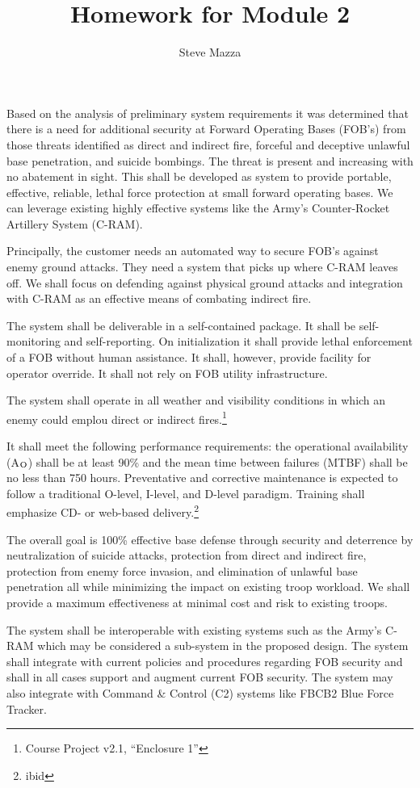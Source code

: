 \documentclass[letterpaper,10pt]{article}
\title{Homework for Module 2}
\author{Steve Mazza}
\begin{document}
\maketitle
Based on the analysis of preliminary system requirements it was determined that there is a need for additional security at Forward Operating Bases (FOB's) from those threats identified as direct and indirect fire, forceful and deceptive unlawful base penetration, and suicide bombings.  The threat is present and increasing with no abatement in sight.  This shall be developed as system to provide portable, effective, reliable, lethal force protection at small forward operating bases.  We can leverage existing highly effective systems like the Army's Counter-Rocket Artillery System (C-RAM).
\par
Principally, the customer needs an automated way to secure FOB's against enemy ground attacks.  They need a system that picks up where C-RAM leaves off.  We shall focus on defending against physical ground attacks and integration with C-RAM as an effective means of combating indirect fire.
\par
The system shall be deliverable in a self-contained package.  It shall be self-monitoring and self-reporting.  On initialization it shall provide lethal enforcement of a FOB without human assistance.  It shall, however, provide facility for operator override.  It shall not rely on FOB utility infrastructure.
\par The system shall operate in all weather and visibility conditions in which an enemy could emplou direct or indirect fires.\footnote{Course Project v2.1, ``Enclosure 1''}
\par It shall meet the following performance requirements: the operational availability (A$_{\rm O}$) shall be at least 90\% and the mean time between failures (MTBF) shall be no less than 750 hours.  Preventative and corrective maintenance is expected to follow a traditional O-level, I-level, and D-level paradigm.  Training shall emphasize CD- or web-based delivery.\footnote{ibid}
\par
The overall goal is 100\% effective base defense through security and deterrence by neutralization of suicide attacks, protection from direct and indirect fire, protection from enemy force invasion, and elimination of unlawful base penetration all while minimizing the impact on existing troop workload.  We shall provide a maximum effectiveness at minimal cost and risk to existing troops.
\par
The system shall be interoperable with existing systems such as the Army's C-RAM which may be considered a sub-system in the proposed design.  The system shall integrate with current policies and procedures regarding FOB security and shall in all cases support and augment current FOB security.  The system may also integrate with Command \& Control (C2) systems like FBCB2 Blue Force Tracker.
\end{document}
